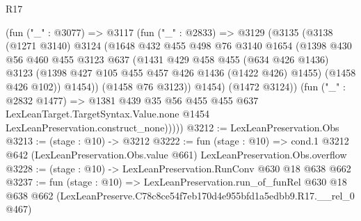 \begin{lexlean}{R17}
\begin{coremodule}
          (fun ("_" : @3077) =>
          @3117
            (fun ("_" : @2833) =>
            @3129
              (@3135
                (@3138
                  (@1271 @3140)
                  @3124
                  (@1648
                    @432
                    @455
                    @498
                    @76
                    @3140
                    @1654
                    (@1398
                      @430
                      @56
                      @460
                      @455
                      @3123
                      @637
                      (@1431
                        @429
                        @458
                        @455
                        (@634 @426 @1436)
                        @3123
                        (@1398 @427 @105 @455 @457 @426 @1436 (@1422 @426) @1455)
                        (@1458 @426 @102))
                      @1454))
                  (@1458 @76 @3123))
                @1454)
              (@1472 @3124))
            (fun ("_" : @2832 @1477) =>
            @1381
              @439
              @35
              @56
              @455
              @455
              @637
              LexLeanTarget.TargetSyntax.Value.none
              @1454
              LexLeanPreservation.construct_none)))))
@3212 := LexLeanPreservation.Obs
@3213 := (stage : @10) -> @3212
@3222 := fun (stage : @10) =>
  cond.{1} @3212 @642 (LexLeanPreservation.Obs.value @661) LexLeanPreservation.Obs.overflow
@3228 := (stage : @10) -> LexLeanPreservation.RunConv @630 @18 @638 @662
@3237 := fun (stage : @10) =>
  LexLeanPreservation.run_of_funRel
    @630
    @18
    @638
    @662
    (LexLeanPreserve.C78c8ce54f7eb170d4e955bfd1a5edbb9.R17.__rel_0 @467)
\end{coremodule}
\end{lexlean}
